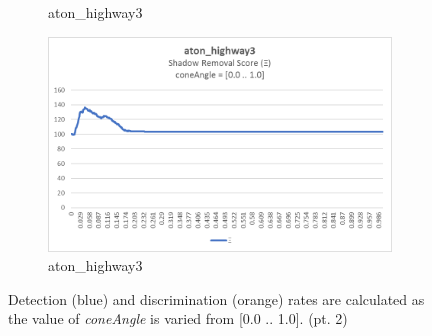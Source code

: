 \begin{appendices}
\begin{figure}
\begin{subfigure}{.45\linewidth}
  \caption{aton\_highway3}
\end{subfigure}
\hfill
\begin{subfigure}{.45\linewidth}
  \includegraphics[width=1\linewidth]{figures/appendix/highway3_coneAngle_score.jpg}
  \caption{aton\_highway3}
\end{subfigure}

\caption{Detection (blue) and discrimination (orange) rates are calculated as the value of \textit{coneAngle} is varied from [0.0 .. 1.0]. (pt. 2)}
\end{figure}


\end{appendices}
